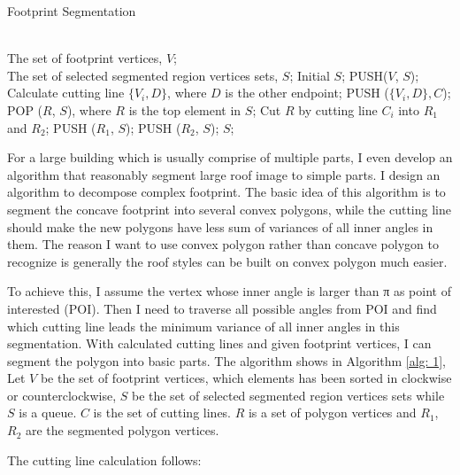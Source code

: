 \documentclass{iitthesis}
\begin{document}
{\linespread{1.5}
\begin{algorithm}[ht]   
	\caption{ Footprint Segmentation}   
	\label{alg: 1}   
	\begin{algorithmic}[1] 
		\REQUIRE ~~\\
		The set of footprint vertices, $V$; 
		\ENSURE ~~\\  
		The set of selected segmented region vertices sets, $S$; 
		\STATE Initial $S$;  
		\STATE PUSH($V$, $S$); 
					\STATE Calculate cutting line $\{V_i, D\}$, where $D$ is the other endpoint;
					\STATE PUSH ($\{V_i, D\}, C$);
				\ENDIF
			\ENDFOR
					\STATE POP ($R$, $S$), where $R$ is the top element in $S$;
					\STATE Cut $R$ by cutting line $C_i$ into $R_1$ and $R_2$;
					\STATE PUSH ($R_1$, $S$);
					\STATE PUSH ($R_2$, $S$);
				\ENDFOR
			\ENDFOR
		\ENDIF   
		\RETURN $S$; 
	\end{algorithmic}  
\end{algorithm}  
}

For a large building which is usually comprise of multiple parts, I even develop an algorithm that reasonably segment large roof image to simple parts. I design an algorithm to decompose complex footprint. The basic idea of this algorithm is to segment the concave footprint into several convex polygons, while the cutting line should make the new polygons have less sum of variances of all inner angles in them. The reason I want to use convex polygon rather than concave polygon to recognize is generally the roof styles can be built on convex polygon much easier. 

To achieve this, I assume the vertex whose inner angle is larger than π as point of interested (POI). Then I need to traverse all possible angles from POI and find which cutting line leads the minimum variance of all inner angles in this segmentation. With calculated cutting lines and given footprint vertices, I can segment the polygon into basic parts. The algorithm shows in Algorithm \ref{alg: 1}, Let $V$ be the set of footprint vertices, which elements has been sorted in clockwise or counterclockwise, $S$ be the set of selected segmented region vertices sets while $S$ is a queue. $C$ is the set of cutting lines. $R$ is a set of polygon vertices and $R_1$, $R_2$ are the segmented polygon vertices.

The cutting line calculation follows:
\end{document}
